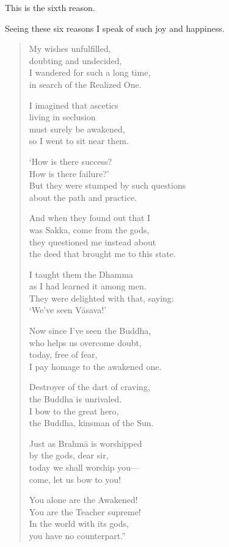 \documentclass[12pt,openany]{book}%
\begin{document}
This is the sixth reason. 

Seeing these six reasons I speak of such joy and happiness. 

\begin{verse}%
My wishes unfulfilled, \\
doubting and undecided, \\
I wandered for such a long time, \\
in search of the Realized One. 

I imagined that ascetics \\
living in seclusion \\
must surely be awakened, \\
so I went to sit near them. 

‘How is there success? \\
How is there failure?’ \\
But they were stumped by such questions \\
about the path and practice. 

And when they found out that I \\
was Sakka, come from the gods, \\
they questioned me instead about \\
the deed that brought me to this state. 

I taught them the Dhamma \\
as I had learned it among men. \\
They were delighted with that, saying: \\
‘We’ve seen \textsanskrit{Vāsava}!’ 

Now since I’ve seen the Buddha, \\
who helps us overcome doubt, \\
today, free of fear, \\
I pay homage to the awakened one. 

Destroyer of the dart of craving, \\
the Buddha is unrivaled. \\
I bow to the great hero, \\
the Buddha, kinsman of the Sun. 

Just as \textsanskrit{Brahmā} is worshipped \\
by the gods, dear sir, \\
today we shall worship you—\\
come, let us bow to you! 

You alone are the Awakened! \\
You are the Teacher supreme! \\
In the world with its gods, \\
you have no counterpart.” 

%
\end{verse}
\end{document}
